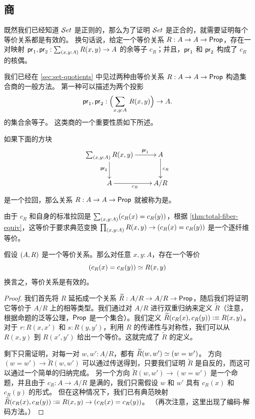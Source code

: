\subsection{商}\label{subsec:quotients}

%
既然我们已经知道 $\mathcal{S}et$ 是正则的，那么为了证明 $\mathcal{S}et$ 是正合的，就需要证明每个等价关系都是有效的。
%
%
换句话说，给定一个等价关系 $R:A\to A\to\mathsf{Prop}$，存在一对映射
$\proj1,\proj2:\sm{x,y:A} R(x,y)\to A$
的余等子 $c_R$；并且，$\mathsf{pr}_{1}$ 和 $\mathsf{pr}_{2}$ 构成了 $c_R$ 的核偶。

我们已经在 \cref{sec:set-quotients} 中见过两种由等价关系 $R:A\to A\to\mathsf{Prop}$ 构造集合商的一般方法。
第一种可以描述为两个投影
\[\proj1,\proj2:\Parens{\sm{x,y:A} R(x,y)} \to A.\]
的集合余等子。
这类商的一个重要性质如下所述。

\begin{defn}
  如果下面的方块
\begin{equation*}
  \xymatrix{
    {\sm{x,y:A} R (x,y)}
    \ar[r]^(0.7){\proj1}
    \ar[d]_{\proj2}
    &
    {A}
    \ar[d]^{c_R}
    \\
    {A}
    \ar[r]_{c_R}
    &
    {A/R}
    }
\end{equation*}
是一个拉回，那么关系 $R:A\to A\to\mathsf{Prop}$ 就被称为是。
%
%
\end{defn}

由于 $c_R$ 和自身的标准拉回是 $\sm{x,y:A} (c_R(x)=c_R(y))$，根据 \cref{thm:total-fiber-equiv}，这等价于要求典范变换 $\prd{x,y:A} R(x,y) \to (c_R(x)=c_R(y))$ 是一个逐纤维等价。

\begin{lem}\label{lem:sets_exact}
假设 ${\mathopen{}(A,R)\mathclose{}}$ 是一个等价关系。那么对任意 $x,y:A$，存在一个等价
\begin{equation*}
(c_R(x)= c_R(y))\simeq R(x,y)
\end{equation*}
换言之，等价关系是有效的。
\end{lem}

\begin{proof}
我们首先将 $R$ 延拓成一个关系 $\widetilde{R}:A/R\to A/R\to\mathsf{Prop}$，随后我们将证明它等价于 $A/R$ 上的相等类型。我们通过对 $A/R$ 进行双重归纳来定义 $\widetilde{R}$（注意，根据命题的泛等公理，$\mathsf{Prop}$ 是一个集合）。我们定义 $\widetilde{R}(c_R(x),c_R(y)) \vcentcolon\equiv R(x,y)$。对于 $r:R(x,x')$ 和 $s:R(y,y')$，利用 $R$ 的传递性与对称性，我们可以从 $R(x,y)$ 到 $R(x',y')$ 给出一个等价。这就完成了 $\widetilde{R}$ 的定义。

剩下只需证明，对每一对 $w,w':A/R$，都有 $\widetilde{R}(w,w')\simeq (w= w')$。
方向 $(w=w')\to \widetilde{R}(w,w')$ 可以通过传送得到，只要我们证明 $\widetilde{R}$ 是自反的，而这可以通过一个简单的归纳完成。
另一个方向 $\widetilde{R}(w,w')\to (w= w')$ 是一个命题，并且由于 $c_R:A\to A/R$ 是满的，我们只需假设 $w$ 和 $w'$ 具有 $c_R(x)$ 和 $c_R(y)$ 的形式。
但在这种情况下，我们已有典范映射 $\widetilde{R}(c_R(x),c_R(y)) \vcentcolon\equiv R(x,y) \to (c_R(x)=c_R(y))$。
（再次注意，这里出现了编码-解码方法。）
\end{proof}


